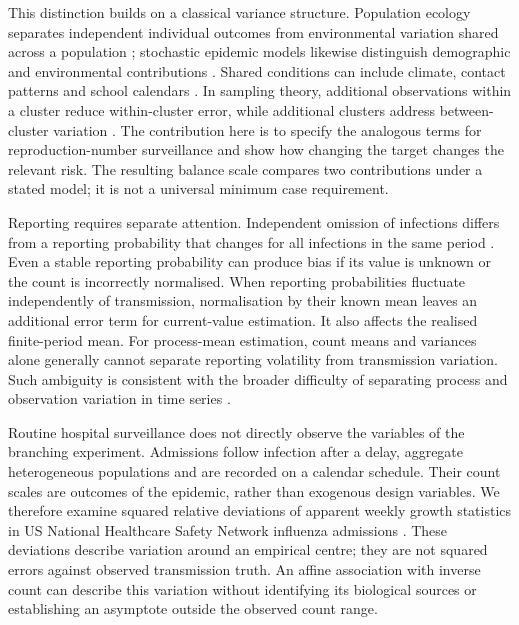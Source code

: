 This distinction builds on a classical variance structure. Population ecology separates independent individual outcomes from environmental variation shared across a population \citep{engen1998demographic, lande2003stochastic}; stochastic epidemic models likewise distinguish demographic and environmental contributions \citep{breto2009time, he2010plug}. Shared conditions can include climate, contact patterns and school calendars \citep{cauchemez2008estimating, shaman2009absolute}. In sampling theory, additional observations within a cluster reduce within-cluster error, while additional clusters address between-cluster variation \citep{cochran1977sampling, hayes1999simple}. The contribution here is to specify the analogous terms for reproduction-number surveillance and show how changing the target changes the relevant risk. The resulting balance scale compares two contributions under a stated model; it is not a universal minimum case requirement.

Reporting requires separate attention. Independent omission of infections differs from a reporting probability that changes for all infections in the same period \citep{azmon2014estimating, stoner2019hierarchical}. Even a stable reporting probability can produce bias if its value is unknown or the count is incorrectly normalised. When reporting probabilities fluctuate independently of transmission, normalisation by their known mean leaves an additional error term for current-value estimation. It also affects the realised finite-period mean. For process-mean estimation, count means and variances alone generally cannot separate reporting volatility from transmission variation. Such ambiguity is consistent with the broader difficulty of separating process and observation variation in time series \citep{knape2008estimability, augermethe2016state}.

Routine hospital surveillance does not directly observe the variables of the branching experiment. Admissions follow infection after a delay, aggregate heterogeneous populations and are recorded on a calendar schedule. Their count scales are outcomes of the epidemic, rather than exogenous design variables. We therefore examine squared relative deviations of apparent weekly growth statistics in US National Healthcare Safety Network influenza admissions \citep{cdc2026nhsn, frutos2025evaluation}. These deviations describe variation around an empirical centre; they are not squared errors against observed transmission truth. An affine association with inverse count can describe this variation without identifying its biological sources or establishing an asymptote outside the observed count range.

